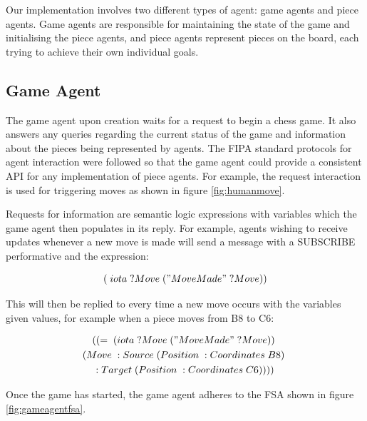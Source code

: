 \documentclass{article}
\begin{document}
Our implementation involves two different types of agent: game agents and piece agents. Game agents are responsible for maintaining the state of the game and initialising the piece agents, and piece agents represent pieces on the board, each trying to achieve their own individual goals.

\subsection{Game Agent}

The game agent upon creation waits for a request to begin a chess game. It also answers any queries regarding the current status of the game and information about the pieces being represented by agents. The FIPA standard protocols for agent interaction \cite{fipaprotocols} were followed so that the game agent could provide a consistent API for any implementation of piece agents. For example, the request interaction is used for triggering moves as shown in figure \ref{fig:humanmove}. 

Requests for information are semantic logic expressions with variables which the game agent then populates in its reply. For example, agents wishing to receive updates whenever a new move is made will send a message with a SUBSCRIBE performative and the expression:

\begin{equation} \label{eq:movesubscribe}
	(\;iota\; ?Move\; ("Move Made"\; ?Move))	
\end{equation}

This will then be replied to every time a new move occurs with the variables given values, for example when a piece moves from B8 to C6:

\begin{multline} \label{eq:movesubscriberesponse}
	((=\; (iota\; ?Move\; ("Move Made"\; ?Move))\;  \\
	(Move\; :Source\; (Position\; :Coordinates\; B8)\; \\
	:Target\; (Position\; :Coordinates\; C6))))
\end{multline}

Once the game has started, the game agent adheres to the FSA shown in figure \ref{fig:gameagentfsa}. 
\end{document}
